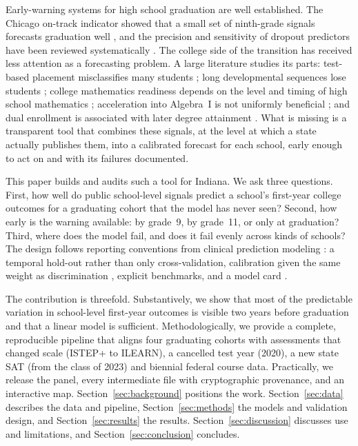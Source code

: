 \documentclass[11pt]{article}
\begin{document}
Early-warning systems for high school graduation are well established. The Chicago on-track indicator showed that a small set of ninth-grade signals forecasts graduation well \citep{allensworth2005}, and the precision and sensitivity of dropout predictors have been reviewed systematically \citep{bowers2013}. The college side of the transition has received less attention as a forecasting problem. A large literature studies its parts: test-based placement misclassifies many students \citep{scottclayton2012}; long developmental sequences lose students \citep{bailey2010}; college mathematics readiness depends on the level and timing of high school mathematics \citep{adelman2006,long2009}; acceleration into Algebra~I is not uniformly beneficial \citep{clotfelter2015,domina2015}; and dual enrollment is associated with later degree attainment \citep{an2013}. What is missing is a transparent tool that combines these signals, at the level at which a state actually publishes them, into a calibrated forecast for each school, early enough to act on and with its failures documented.

This paper builds and audits such a tool for Indiana. We ask three questions. First, how well do public school-level signals predict a school's first-year college outcomes for a graduating cohort that the model has never seen? Second, how early is the warning available: by grade~9, by grade~11, or only at graduation? Third, where does the model fail, and does it fail evenly across kinds of schools? The design follows reporting conventions from clinical prediction modeling \citep{collins2015,steyerberg2019}: a temporal hold-out rather than only cross-validation, calibration given the same weight as discrimination \citep{vancalster2019}, explicit benchmarks, and a model card \citep{mitchell2019}.

The contribution is threefold. Substantively, we show that most of the predictable variation in school-level first-year outcomes is visible two years before graduation and that a linear model is sufficient. Methodologically, we provide a complete, reproducible pipeline that aligns four graduating cohorts with assessments that changed scale (ISTEP+ to ILEARN), a cancelled test year (2020), a new state SAT (from the class of 2023) and biennial federal course data. Practically, we release the panel, every intermediate file with cryptographic provenance, and an interactive map. Section~\ref{sec:background} positions the work. Section~\ref{sec:data} describes the data and pipeline, Section~\ref{sec:methods} the models and validation design, and Section~\ref{sec:results} the results. Section~\ref{sec:discussion} discusses use and limitations, and Section~\ref{sec:conclusion} concludes.
\end{document}
